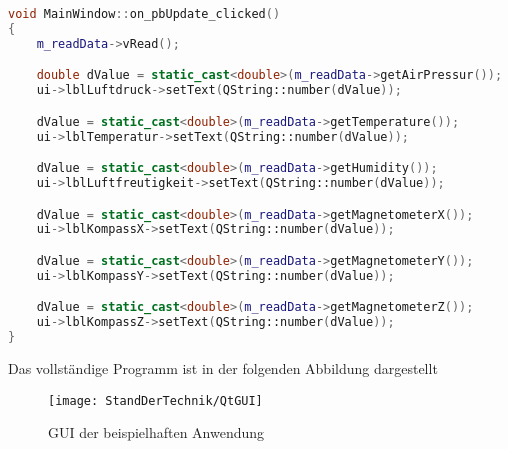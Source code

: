 \begin{lstlisting}[language=C++, caption=Slot Methode für den Update-Button,
    label=lst:updateSlot]
void MainWindow::on_pbUpdate_clicked()
{
    m_readData->vRead();

    double dValue = static_cast<double>(m_readData->getAirPressur());
    ui->lblLuftdruck->setText(QString::number(dValue));

    dValue = static_cast<double>(m_readData->getTemperature());
    ui->lblTemperatur->setText(QString::number(dValue));

    dValue = static_cast<double>(m_readData->getHumidity());
    ui->lblLuftfreutigkeit->setText(QString::number(dValue));

    dValue = static_cast<double>(m_readData->getMagnetometerX());
    ui->lblKompassX->setText(QString::number(dValue));

    dValue = static_cast<double>(m_readData->getMagnetometerY());
    ui->lblKompassY->setText(QString::number(dValue));

    dValue = static_cast<double>(m_readData->getMagnetometerZ());
    ui->lblKompassZ->setText(QString::number(dValue));
}

\end{lstlisting}

Das vollständige Programm ist in der folgenden Abbildung dargestellt

\begin{figure}[h]
    \centering
    \texttt{[image: StandDerTechnik/QtGUI]}
    \caption[GUI der beispielhaften Anwendung]{GUI der beispielhaften Anwendung}
    \label{img:qtGui}
\end{figure}
